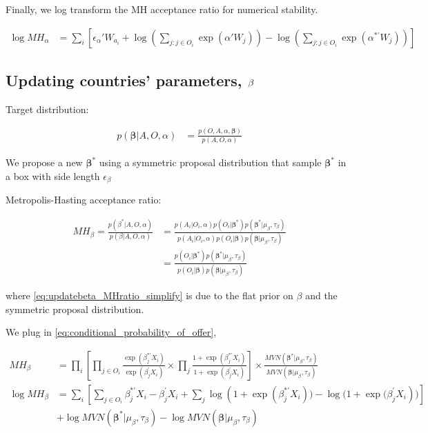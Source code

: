 Finally, we log transform the MH acceptance ratio for numerical stability.

\begin{align}
\log MH_\alpha &= \sum_i \left[ \epsilon_\alpha' W_{a_i} + \log\left(\sum\limits_{j:j \in O_i} \exp(\alpha' W_j)\right) - \log\left(\sum\limits_{j:j \in O_i} \exp(\alpha^{*\prime} W_j)\right) \right]
\end{align}

\subsection{Updating countries' parameters, \texorpdfstring{$\boldmath\beta$}{}}

Target distribution:

\begin{align}
p(\bm{\beta}|A, O, \alpha) &= \frac{p(O, A, \alpha, \bm{\beta})}{p(A, O, \alpha)}
\end{align}

We propose a new $\bm{\beta}^*$ using a symmetric proposal distribution that sample $\bm{\beta}^*$ in a box with side length $\epsilon_\beta$

Metropolis-Hasting acceptance ratio:

\begin{align}
MH_\beta = \frac{p(\beta^* | A, O, \alpha)}{p(\beta | A, O, \alpha)} &= \frac{p(A_i | O_i, \alpha)p(O_i|\bm{\beta}^*)p(\bm{\beta}^*|\mu_{\beta}, \tau_{\beta})}{p(A_i | O_i, \alpha)p(O_i|\bm{\beta})p(\bm{\beta}|\mu_{\beta}, \tau_{\beta})} \label{eq:updatebeta_MHratio_simplify} \\
&= \frac{p(O_i|\bm{\beta}^*)p(\bm{\beta}^*|\mu_{\beta}, \tau_{\beta})}{p(O_i|\bm{\beta})p(\bm{\beta}|\mu_{\beta}, \tau_{\beta})} \label{eq:updatebeta_MHratio_final}
\end{align}

where \eqref{eq:updatebeta_MHratio_simplify} is due to the flat prior on $\beta$ and the symmetric proposal distribution.

We plug in \eqref{eq:conditional_probability_of_offer},

\begin{align}
MH_\beta &= \prod_i \left[ \prod\limits_{j \in O_i}\frac{ \exp(\beta_j^{*\prime}X_i)}{ \exp(\beta_j^{\prime}X_i)} \times \prod\limits_{j}\frac{1 + \exp(\beta_j^{*\prime}X_i)}{1 + \exp(\beta_j^{\prime}X_i)} \right] \times \frac{MVN(\bm{\beta}^*|\mu_{\beta}, \tau_{\beta})}{MVN(\bm{\beta}|\mu_{\beta}, \tau_{\beta})} \\
  \log MH_\beta &= \sum_i \left[ \sum_{j \in O_i} \beta_j^{*\prime}X_i - \beta_j^{\prime}X_i + \sum_{j} \log(1 + {\exp({\beta_j^{*\prime}X_i})) - \log(1 +  \exp(\beta_j^{\prime}X_i})) \right] \\
 & + \log MVN(\bm{\beta}^*|\mu_{\beta}, \tau_{\beta}) - \log MVN(\bm{\beta}|\mu_{\beta}, \tau_{\beta}) \nonumber
\end{align}

